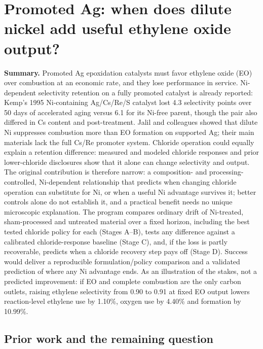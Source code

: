 \section{Promoted Ag: when does dilute nickel add useful ethylene oxide output?}
\label{sec:silver}

\textbf{Summary.} Promoted Ag epoxidation catalysts must favor ethylene oxide (EO) over combustion at an economic rate, and they lose performance in service. Ni-dependent selectivity retention on a fully promoted catalyst is already reported: Kemp's 1995 Ni-containing Ag/Cs/Re/S catalyst lost 4.3 selectivity points over 50 days of accelerated aging versus 6.1 for its Ni-free parent, though the pair also differed in Cs content and post-treatment.\citep{kemp1995} Jalil and colleagues showed that dilute Ni suppresses combustion more than EO formation on supported Ag; their main materials lack the full Cs/Re promoter system.\citep{jalil2025} Chloride operation could equally explain a retention difference: measured and modeled chloride responses and prior lower-chloride disclosures show that it alone can change selectivity and output.\citep{iyer2021,santos2024,lee2024underchloride,modifier2024} The original contribution is therefore narrow: a composition- and processing-controlled, Ni-dependent relationship that predicts when changing chloride operation can substitute for Ni, or when a useful Ni advantage survives it; better controls alone do not establish it, and a practical benefit needs no unique microscopic explanation. The program compares ordinary drift of Ni-treated, sham-processed and untreated material over a fixed horizon, including the best tested chloride policy for each (Stages A--B), tests any difference against a calibrated chloride-response baseline (Stage C), and, if the loss is partly recoverable, predicts when a chloride recovery step pays off (Stage D). Success would deliver a reproducible formulation/policy comparison and a validated prediction of where any Ni advantage ends. As an illustration of the stakes, not a predicted improvement: if EO and complete combustion are the only carbon outlets, raising ethylene selectivity from 0.90 to 0.91 at fixed EO output lowers reaction-level ethylene use by 1.10\%, oxygen use by 4.40\% and \COtwo{} formation by 10.99\%.

\subsection{Prior work and the remaining question}

